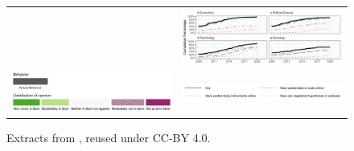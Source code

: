 \documentclass{Revue-economique}
\newcommand{\citet}{\textcite}
\begin{document}
\begin{Article} [%
	Titre={Reproducibility and Open Science in Economics},
	Auteur={Lars Vilhuber\thanks{Cornell University, lars.vilhuber@cornell.edu}}]
\begin{refsection}[Main]
\begin{figure}
\begin{tabular}{cc}
    &  
    \includegraphics[width=0.65\linewidth]{data/christensen-2019-fig7.png}
    \\
    \includegraphics[width=0.30\linewidth]{data/christensen-2019-fig1-legend.png}
         &  
    \includegraphics[width=0.5\linewidth]{data/christensen-2019-fig7-legend.png}
    \\
    \end{tabular}
    \caption{Extracts from \citet[Figures 1 and 7]{ferguson_survey_2023}, reused under CC-BY 4.0.}
    \label{fig:christensen-fig1b}
\end{figure}







\end{refsection}
\end{Article}
\end{document}
